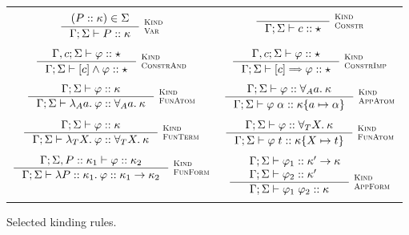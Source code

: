 \documentclass[english, mgr]{iithesis}
\newcommand{\scbrk}[2]{\myatop{\textsc{#1}}{\textsc{#2}}}
\begin{document}
\begin{figure}[htpb]
  \begin{tabularx}{\textwidth}{|CC|}
    \hline & \\
     $\inference{
      (\propv \ofkind \kind) \in  \kEnv
  }{
    \cEnv; \kEnv \vdash \propv \ofkind \kind
  }\:\scbrk{Kind}{Var}
  $ &
     $\inference{
  }{
    \cEnv; \kEnv \vdash \fConstr{\constr} \ofkind \kProp
  }\:\scbrk{Kind}{Constr}
  $ \\ & \\ $
  \inference{
    \cEnv,\constr; \kEnv \vdash \formphi \ofkind \kProp
  }{
    \cEnv; \kEnv \vdash \fCAnd{\constr} \formphi \ofkind \kProp
  }\:\scbrk{Kind}{ConstrAnd}
  $ & $
  \inference{
    \cEnv,\constr; \kEnv \vdash \formphi \ofkind \kProp
  }{
    \cEnv; \kEnv \vdash \fCImp{\constr} \formphi \ofkind \kProp
  }\:\scbrk{Kind}{ConstrImp}$ \\ & \\
    $\inference{
      \cEnv; \kEnv \vdash \formphi \ofkind \kind
    }{
      \cEnv; \kEnv \vdash \fLamAtom{\atomv} \formphi \ofkind \kForallAtom{\atomv}\kind
    }\:\scbrk{Kind}{FunAtom}$
    &
    $\inference{
      \cEnv;\kEnv\vdash \formphi \ofkind \kForallAtom{\atomv}\kind
    }{
      \cEnv;\kEnv\vdash \formphi \fAppAtom{\atomexp} \ofkind \kind \subst{\atomv}{\atomexp}
    }\:\scbrk{Kind}{AppAtom}$
    \\ & \\
    $\inference{
      \cEnv; \kEnv \vdash \formphi \ofkind \kind
    }{
      \cEnv; \kEnv \vdash \fLamTerm{\termv} \formphi \ofkind \kForallTerm{\termv}\kind
    }\:\scbrk{Kind}{FunTerm}$
    &
    $\inference{
      \cEnv;\kEnv\vdash \formphi \ofkind \kForallTerm{\termv}\kind
    }{
      \cEnv;\kEnv\vdash \formphi \fAppTerm{\term} \ofkind \kind\subst{\termv}{\term}
    }\:\scbrk{Kind}{FunAtom}$
    \\ & \\
    $\inference{
      \cEnv; \kEnv, \propv \ofkind \kind_1 \vdash \formphi \ofkind \kind_2
    }{
      \cEnv; \kEnv \vdash \fLamForm{\propv}{\kind_1} \formphi \ofkind \kind_1 \karrow \kind_2
    }\:\scbrk{Kind}{FunForm}$
    &
    $\inference{
      \quad \cEnv; \kEnv \vdash \formphi_1 \ofkind \kind' \karrow \kind
      \\
      \quad \cEnv; \kEnv \vdash \formphi_2 \ofkind \kind' \hfill
    }{
      \cEnv;\kEnv\vdash \formphi_1 \fApp \formphi_2 \ofkind \kind
    }\:\scbrk{Kind}{AppForm}$
    \\ & \\
    \hline
\end{tabularx}
  \caption{Selected kinding rules.}
  \label{fig:kinding}
\end{figure}
\end{document}
